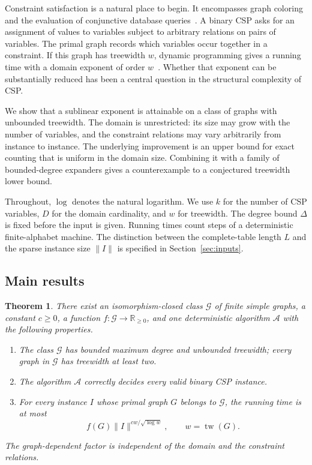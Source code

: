 \documentclass[11pt,reqno]{amsart}
\numberwithin{equation}{section}
\newtheorem{theorem}{Theorem}[section]
\theoremstyle{definition}
\theoremstyle{remark}
\newcommand{\tw}{\operatorname{tw}}
\newcommand{\R}{\mathbb R}
\begin{document}
Constraint satisfaction is a natural place to begin. It encompasses graph coloring and the evaluation of conjunctive database queries~\cite{KS13}. A binary CSP asks for an assignment of values to variables subject to arbitrary relations on pairs of variables. The primal graph records which variables occur together in a constraint. If this graph has treewidth $w$, dynamic programming gives a running time with a domain exponent of order $w$~\cite{Freuder90}. Whether that exponent can be substantially reduced has been a central question in the structural complexity of CSP.

We show that a sublinear exponent is attainable on a class of graphs with unbounded treewidth. The domain is unrestricted: its size may grow with the number of variables, and the constraint relations may vary arbitrarily from instance to instance. The underlying improvement is an upper bound for exact counting that is uniform in the domain size. Combining it with a family of bounded-degree expanders gives a counterexample to a conjectured treewidth lower bound.

Throughout, $\log$ denotes the natural logarithm. We use $k$ for the number of CSP variables, $D$ for the domain cardinality, and $w$ for treewidth. The degree bound $\Delta$ is fixed before the input is given. Running times count steps of a deterministic finite-alphabet machine. The distinction between the complete-table length $L$ and the sparse instance size $\lVert I\rVert$ is specified in Section~\ref{sec:inputs}.

\subsection{Main results}

\begin{theorem}\label{thm:main}
There exist an isomorphism-closed class $\mathcal G$ of finite simple graphs, a constant $c\ge0$, a function $f:\mathcal G\to\R_{\ge0}$, and one deterministic algorithm $\mathcal A$ with the following properties.
\begin{enumerate}
\item The class $\mathcal G$ has bounded maximum degree and unbounded treewidth; every graph in $\mathcal G$ has treewidth at least two.
\item The algorithm $\mathcal A$ correctly decides every valid binary CSP instance.
\item For every instance $I$ whose primal graph $G$ belongs to $\mathcal G$, the running time is at most
\begin{equation}\label{eq:main}
 f(G)\lVert I\rVert^{c w/\sqrt{\log w}},\qquad w=\tw(G).
\end{equation}
\end{enumerate}
The graph-dependent factor is independent of the domain and the constraint relations.
\end{theorem}
\end{document}
